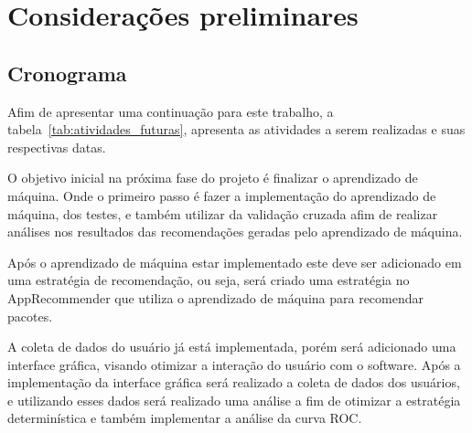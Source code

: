 \chapter[Considerações preliminares]{Considerações preliminares}

\section{Cronograma}

Afim de apresentar uma continuação para este trabalho, a tabela~\ref{tab:atividades_futuras},
apresenta as atividades a serem realizadas e suas respectivas datas.

\begin{table}[h]
\centering
{}
\caption{Atividades a serem realizadas}
\label{tab:atividades_futuras}
\end{table}

O objetivo inicial na próxima fase do projeto é finalizar o aprendizado
de máquina. Onde o primeiro passo é fazer a implementação do aprendizado
de máquina, dos testes, e também utilizar da validação cruzada afim de
realizar análises nos resultados das recomendações geradas pelo aprendizado
de máquina.

Após o aprendizado de máquina estar implementado este deve ser adicionado
em uma estratégia de recomendação, ou seja, será criado uma estratégia
no AppRecommender que utiliza o aprendizado de máquina para recomendar
pacotes.

A coleta de dados do usuário já está implementada, porém será adicionado
uma interface gráfica, visando otimizar a interação do usuário com o
software. Após a implementação da interface gráfica será realizado a
coleta de dados dos usuários, e utilizando esses dados será realizado
uma análise a fim de otimizar a estratégia determinística e também
implementar a análise da curva ROC.

